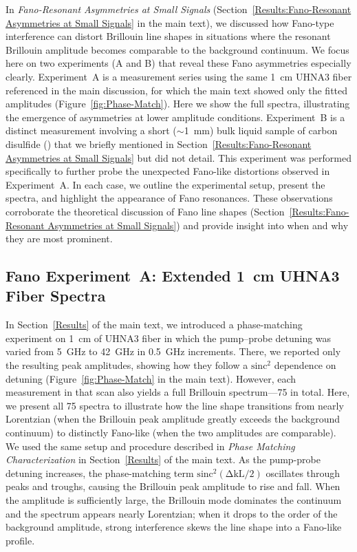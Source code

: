 In \textit{Fano-Resonant Asymmetries at Small Signals} (Section~\ref{Results:Fano-Resonant Asymmetries at Small Signals} in the main text), we discussed how Fano-type interference can distort Brillouin line shapes in situations where the resonant Brillouin amplitude becomes comparable to the background continuum. We focus here on two experiments (A and B) that reveal these Fano asymmetries especially clearly. Experiment~A is a measurement series using the same \SI{1}{\centi\meter} UHNA3 fiber referenced in the main discussion, for which the main text showed only the fitted amplitudes (Figure~\ref{fig:Phase-Match}). Here we show the full spectra, illustrating the emergence of asymmetries at lower amplitude conditions. Experiment~B is a distinct measurement involving a short (\(\sim\)\SI{1}{\milli\meter}) bulk liquid sample of carbon disulfide () that we briefly mentioned in Section~\ref{Results:Fano-Resonant Asymmetries at Small Signals} but did not detail. This experiment was performed specifically to further probe the unexpected Fano-like distortions observed in Experiment~A. In each case, we outline the experimental setup, present the spectra, and highlight the appearance of Fano resonances. These observations corroborate the theoretical discussion of Fano line shapes (Section~\ref{Results:Fano-Resonant Asymmetries at Small Signals}) and provide insight into when and why they are most prominent.

\subsection{Fano Experiment~A: Extended \SI{1}{\centi\meter} UHNA3 Fiber Spectra}
\label{Appendix:Fano:Experiment A}

In Section~\ref{Results} of the main text, we introduced a phase-matching experiment on \SI{1}{\centi\meter} of UHNA3 fiber in which the pump--probe detuning was varied from \SI{5}{\giga\hertz} to \SI{42}{\giga\hertz} in \SI{0.5}{\giga\hertz} increments. There, we reported only the resulting peak amplitudes, showing how they follow a \(\mathrm{sinc^{2}}\) dependence on detuning (Figure~\ref{fig:Phase-Match} in the main text). However, each measurement in that scan also yields a full Brillouin spectrum—75 in total. Here, we present all 75 spectra to illustrate how the line shape transitions from nearly Lorentzian (when the Brillouin peak amplitude greatly exceeds the background continuum) to distinctly Fano-like (when the two amplitudes are comparable). We used the same setup and procedure described in \textit{Phase Matching Characterization} in Section~\ref{Results} of the main text. As the pump-probe detuning increases, the phase-matching term \(\mathrm{sinc^{2}(\Delta kL/2)}\) oscillates through peaks and troughs, causing the Brillouin peak amplitude to rise and fall. When the amplitude is sufficiently large, the Brillouin mode dominates the continuum and the spectrum appears nearly Lorentzian; when it drops to the order of the background amplitude, strong interference skews the line shape into a Fano-like profile.

